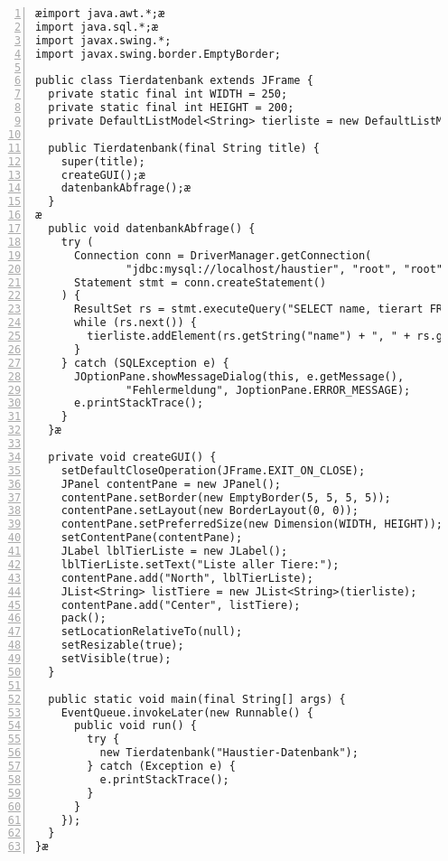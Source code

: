 \begin{lstlisting}[numbers=left, xleftmargin=7mm]
æimport java.awt.*;æ
import java.sql.*;æ
import javax.swing.*;
import javax.swing.border.EmptyBorder;

public class Tierdatenbank extends JFrame {
  private static final int WIDTH = 250;
  private static final int HEIGHT = 200;
  private DefaultListModel<String> tierliste = new DefaultListModel<String>();

  public Tierdatenbank(final String title) {
    super(title);
    createGUI();æ
    datenbankAbfrage();æ
  }
æ  
  public void datenbankAbfrage() {
    try (
      Connection conn = DriverManager.getConnection(
              "jdbc:mysql://localhost/haustier", "root", "root");
      Statement stmt = conn.createStatement()
    ) {
      ResultSet rs = stmt.executeQuery("SELECT name, tierart FROM tier");
      while (rs.next()) {
        tierliste.addElement(rs.getString("name") + ", " + rs.getString("tierart")); 
      }
    } catch (SQLException e) {
      JOptionPane.showMessageDialog(this, e.getMessage(),
              "Fehlermeldung", JoptionPane.ERROR_MESSAGE);
      e.printStackTrace();
    }
  }æ
  
  private void createGUI() {
    setDefaultCloseOperation(JFrame.EXIT_ON_CLOSE);
    JPanel contentPane = new JPanel();
    contentPane.setBorder(new EmptyBorder(5, 5, 5, 5));
    contentPane.setLayout(new BorderLayout(0, 0));
    contentPane.setPreferredSize(new Dimension(WIDTH, HEIGHT));
    setContentPane(contentPane);
    JLabel lblTierListe = new JLabel();
    lblTierListe.setText("Liste aller Tiere:");
    contentPane.add("North", lblTierListe);
    JList<String> listTiere = new JList<String>(tierliste);
    contentPane.add("Center", listTiere);
    pack();
    setLocationRelativeTo(null);
    setResizable(true);
    setVisible(true);  
  }
  
  public static void main(final String[] args) {
    EventQueue.invokeLater(new Runnable() {
      public void run() {
        try {
          new Tierdatenbank("Haustier-Datenbank");
        } catch (Exception e) {
          e.printStackTrace();
        }
      }
    });
  }
}æ
\end{lstlisting}